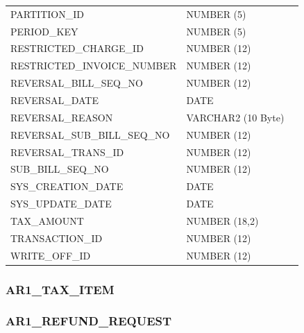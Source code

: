 \documentclass[12pt,twoside]{article}
\begin{document}
\begin{longtable}{lll}
 PARTITION\_ID                 &  NUMBER (5)          &                        \\
 PERIOD\_KEY                   &  NUMBER (5)          &                        \\
 RESTRICTED\_CHARGE\_ID        &  NUMBER (12)         &                        \\
 RESTRICTED\_INVOICE\_NUMBER   &  NUMBER (12)         &                        \\
 REVERSAL\_BILL\_SEQ\_NO       &  NUMBER (12)         &                        \\
 REVERSAL\_DATE                &  DATE                &                        \\
 REVERSAL\_REASON              &  VARCHAR2 (10 Byte)  &                        \\
 REVERSAL\_SUB\_BILL\_SEQ\_NO  &  NUMBER (12)         &                        \\
 REVERSAL\_TRANS\_ID           &  NUMBER (12)         &                        \\
 SUB\_BILL\_SEQ\_NO            &  NUMBER (12)         &                        \\
 SYS\_CREATION\_DATE           &  DATE                &                        \\
 SYS\_UPDATE\_DATE             &  DATE                &                        \\
 TAX\_AMOUNT                   &  NUMBER (18,2)       &                        \\
 TRANSACTION\_ID               &  NUMBER (12)         &                        \\
 WRITE\_OFF\_ID                &  NUMBER (12)         &                        \\
\hline
\end{longtable}

\normalsize
\subsubsection{AR1\_TAX\_ITEM}
\label{sec-11-6-6}
\subsubsection{AR1\_REFUND\_REQUEST}
\label{sec-11-6-7}
\end{document}
